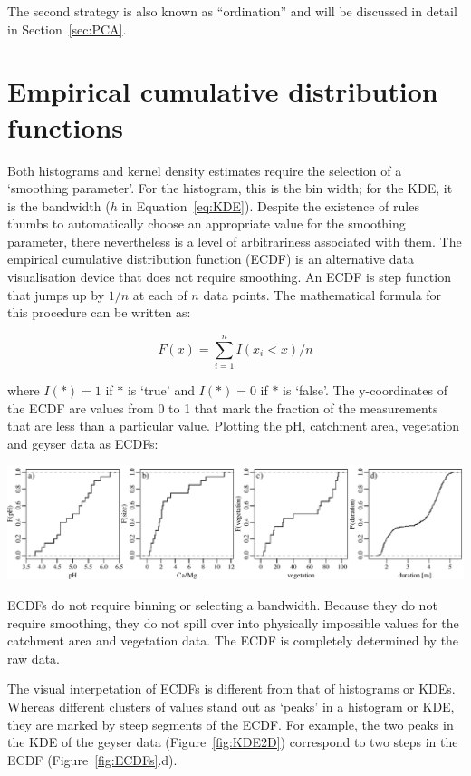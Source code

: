 The second strategy is also known as ``ordination'' and will be
discussed in detail in Section~\ref{sec:PCA}.

\section{Empirical cumulative distribution functions}
\label{sec:ECDF}

Both histograms and kernel density estimates require the selection of
a `smoothing parameter'. For the histogram, this is the bin width; for
the KDE, it is the bandwidth ($h$ in Equation~\ref{eq:KDE}). Despite
the existence of rules thumbs to automatically choose an appropriate
value for the smoothing parameter, there nevertheless is a level of
arbitrariness associated with them. The empirical cumulative
distribution function (ECDF) is an alternative data visualisation
device that does not require smoothing. An ECDF is step function that
jumps up by $1/n$ at each of $n$ data points.  The mathematical
formula for this procedure can be written as:
  
  \begin{equation}
    F(x) = \sum\limits_{i=1}^{n} I(x_i<x)/n
    \label{eq:ECDF}
  \end{equation}
 
\noindent where $I(\ast) = 1$ if $\ast$ is `true' and $I(\ast) = 0$ if
$\ast$ is `false'. The y-coordinates of the ECDF are values from 0 to
1 that mark the fraction of the measurements that are less than a
particular value.  Plotting the pH, catchment area, vegetation and
geyser data as ECDFs:

\noindent\includegraphics[width=\textwidth]{../figures/ECDFs.pdf}
\begingroup {}
\label{fig:ECDFs}
\endgroup

ECDFs do not require binning or selecting a bandwidth.  Because they
do not require smoothing, they do not spill over into physically
impossible values for the catchment area and vegetation data. The ECDF
is completely determined by the raw data.\medskip

The visual interpetation of ECDFs is different from that of histograms
or KDEs. Whereas different clusters of values stand out as `peaks' in
a histogram or KDE, they are marked by steep segments of the ECDF. For
example, the two peaks in the KDE of the geyser data
(Figure~\ref{fig:KDE2D}) correspond to two steps in the ECDF
(Figure~\ref{fig:ECDFs}.d).

